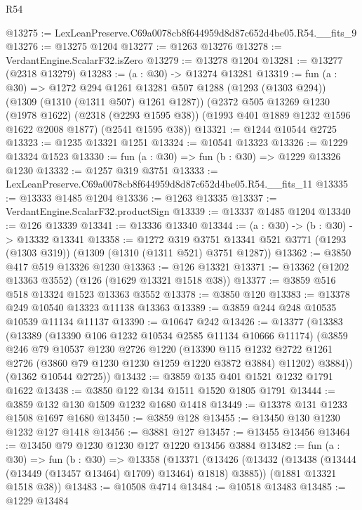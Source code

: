 \begin{lexlean}{R54}
\begin{coremodule}
@13275 := LexLeanPreserve.C69a0078cb8f644959d8d87c652d4be05.R54.__fits_9
@13276 := @13275 @1204
@13277 := @1263 @13276
@13278 := VerdantEngine.ScalarF32.isZero
@13279 := @13278 @1204
@13281 := @13277 (@2318 @13279)
@13283 := (a : @30) -> @13274 @13281
@13319 := fun (a : @30) =>
  @1272
    @294
    @1261
    @13281
    @507
    @1288
    (@1293 (@1303 @294))
    (@1309 (@1310 (@1311 @507) @1261 @1287))
    (@2372
      @505
      @13269
      @1230
      (@1978 @1622)
      (@2318 (@2293 @1595 @38))
      (@1993 @401 @1889 @1232 @1596 @1622 @2008 @1877)
      (@2541 @1595 @38))
@13321 := @1244 @10544 @2725
@13323 := @1235 @13321 @1251
@13324 := @10541 @13323
@13326 := @1229 @13324 @1523
@13330 := fun (a : @30) => fun (b : @30) => @1229 @13326 @1230
@13332 := @1257 @319 @3751
@13333 := LexLeanPreserve.C69a0078cb8f644959d8d87c652d4be05.R54.__fits_11
@13335 := @13333 @1485 @1204
@13336 := @1263 @13335
@13337 := VerdantEngine.ScalarF32.productSign
@13339 := @13337 @1485 @1204
@13340 := @126 @13339
@13341 := @13336 @13340
@13344 := (a : @30) -> (b : @30) -> @13332 @13341
@13358 := @1272
    @319
    @3751
    @13341
    @521
    @3771
    (@1293 (@1303 @319))
    (@1309 (@1310 (@1311 @521) @3751 @1287))
@13362 := @3850 @417 @519 @13326 @1230
@13363 := @126 @13321
@13371 := @13362 (@1202 @13363 @3552) (@126 (@1629 @13321 @1518 @38))
@13377 := @3859 @516 @518 @13324 @1523 @13363 @3552
@13378 := @3850 @120
@13383 := @13378 @249 @10540 @13323 @11138 @13363
@13389 := @3859 @244 @248 @10535 @10539 @11134 @11137
@13390 := @10647 @242
@13426 := @13377
    (@13383
      (@13389
        (@13390 @106 @1232 @10534 @2585 @11134 @10666 @11174)
        (@3859
          @246
          @79
          @10537
          @1230
          @2726
          @1220
          (@13390
            @115
            @1232
            @2722
            @1261
            @2726
            (@3860 @79 @1230 @1230 @1259 @1220 @3872 @3884)
            @11202)
          @3884))
      (@1362 @10544 @2725))
@13432 := @3859 @135 @401 @1521 @1232 @1791 @1622
@13438 := @3850 @122 @134 @1511 @1520 @1805 @1791
@13444 := @3859 @132 @130 @1509 @1232 @1680 @1418
@13449 := @13378 @131 @1233 @1508 @1697 @1680
@13450 := @3859 @128
@13455 := @13450 @130 @1230 @1232 @127 @1418
@13456 := @3881 @127
@13457 := @13455 @13456
@13464 := @13450 @79 @1230 @1230 @127 @1220 @13456 @3884
@13482 := fun (a : @30) =>
  fun (b : @30) =>
  @13358
    (@13371
      (@13426 (@13432 (@13438 (@13444 (@13449 (@13457 @13464) @1709) @13464) @1818) @3885))
      (@1881 @13321 @1518 @38))
@13483 := @10508 @4714
@13484 := @10518 @13483
@13485 := @1229 @13484

\end{coremodule}
\end{lexlean}
